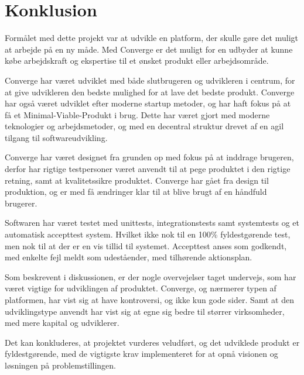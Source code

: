 \chapter{Konklusion}
\label{cha:conclusion}

Formålet med dette projekt var at udvikle en platform, der skulle gøre det muligt at arbejde på en ny måde. Med Converge er det muligt for en udbyder at kunne købe arbejdskraft og ekspertise til et ønsket produkt eller arbejdsområde.

Converge har været udviklet med både slutbrugeren og udvikleren i centrum, for at give udvikleren den bedste mulighed for at lave det bedste produkt. Converge har også været udviklet efter moderne startup metoder, og har haft fokus på at få et Minimal-Viable-Produkt i brug. Dette har været gjort med moderne teknologier og arbejdsmetoder, og med en decentral struktur drevet af en agil tilgang til softwareudvikling.

Converge har været designet fra grunden op med fokus på at inddrage brugeren, derfor har rigtige testpersoner været anvendt til at pege produktet i den rigtige retning, samt at kvalitetssikre produktet. Converge har gået fra design til produktion, og er med få ændringer klar til at blive brugt af en håndfuld brugerer.

Softwaren har været testet med unittests, integrationstests samt systemtests og et automatisk accepttest system. Hvilket ikke nok til en 100\% fyldestgørende test, men nok til at der er en vis tillid til systemet. Accepttest anses som godkendt, med enkelte fejl meldt som udeståender, med tilhørende aktionsplan.

Som beskrevent i diskussionen, er der nogle overvejelser taget undervejs, som har været vigtige for udviklingen af produktet. Converge, og nærmerer typen af platformen, har vist sig at have kontroversi, og ikke kun gode sider. Samt at den udviklingstype anvendt har vist sig at egne sig bedre til størrer virksomheder, med mere kapital og udviklerer.

Det kan konkluderes, at projektet vurderes veludført, og det udviklede produkt er fyldestgørende, med de vigtigste krav implementeret for at opnå visionen og løsningen på problemstillingen.

